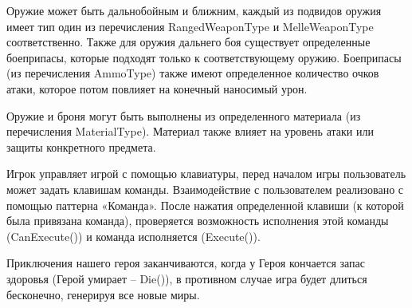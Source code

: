 \documentclass[a4paper,10pt]{article}
\begin{document}
Оружие может быть дальнобойным и ближним, каждый из подвидов оружия имеет тип один из перечисления RangedWeaponType и  MelleWeaponType соответственно. Также для оружия дальнего боя существует определенные боеприпасы, которые подходят только к соответствующему оружию.  Боеприпасы (из перечисления AmmoType) также имеют определенное количество очков атаки, которое потом повлияет на конечный наносимый урон. 

Оружие и броня могут быть выполнены из определенного материала (из перечисления MaterialType). Материал также влияет на уровень атаки или защиты конкретного предмета.


Игрок управляет игрой с помощью клавиатуры, перед началом игры пользователь может задать клавишам команды. Взаимодействие с пользователем реализовано с помощью паттерна «Команда». После нажатия определенной клавиши (к которой была привязана команда), проверяется возможность исполнения этой команды (CanExecute()) и команда исполняется (Execute()). 

Приключения нашего героя заканчиваются, когда у Героя кончается запас здоровья (Герой умирает -- Die()), в противном случае игра будет длиться бесконечно, генерируя все новые миры. 
\end{document}
